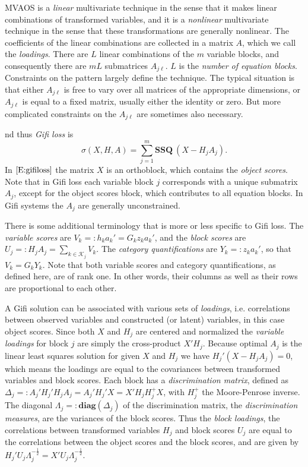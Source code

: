 \documentclass[
  12pt,
  letterpaper,
  DIV=11,
  numbers=noendperiod]{scrreprt}
\newcommand{\df}{=:}
\begin{document}
MVAOS is a \emph{linear} multivariate technique in the sense that it
makes linear combinations of transformed variables, and it is a
\emph{nonlinear} multivariate technique in the sense that these
transformations are generally nonlinear. The coefficients of the linear
combinations are collected in a matrix \(A\), which we call the
\emph{loadings}. There are \(L\) linear combinations of the \(m\)
variable blocks, and consequently there are \(mL\) submatrices
\(A_{j\ell}\). \(L\) is the \emph{number of equation blocks}.
Constraints on the pattern largely define the technique. The typical
situation is that either \(A_{j\ell}\) is free to vary over all matrices
of the appropriate dimensions, or \(A_{j\ell}\) is equal to a fixed
matrix, usually either the identity or zero. But more complicated
constraints on the \(A_{j\ell}\) are sometimes also necessary.

nd thus \emph{Gifi loss} is \begin{equation}
\sigma(X,H,A)=\sum_{j=1}^m\mathbf{SSQ}\ (X-H_jA_j).\label{E:gifiloss}
\end{equation} In \(\eqref{E:gifiloss}\) the matrix \(X\) is an
orthoblock, which contains the \emph{object scores}. Note that in Gifi
loss each variable block \(j\) corresponds with a unique submatrix
\(A_j\), except for the object scores block, which contributes to all
equation blocks. In Gifi systems the \(A_j\) are generally
unconstrained.

There is some additional terminology that is more or less specific to
Gifi loss. The \emph{variable scores} are \(V_k\df h_ka_k'=G_kz_ka_k'\),
and the \emph{block scores} are
\(U_j\df H_jA_j=\sum_{k\in\mathcal{K}_j}V_k\). The \emph{category
quantifications} are \(Y_k\df z_ka_k'\), so that \(V_k=G_kY_k\). Note
that both variable scores and category quantifications, as defined here,
are of rank one. In other words, their columns as well as their rows are
proportional to each other.

A Gifi solution can be associated with various sets of \emph{loadings},
i.e. correlations between observed variables and constructed (or latent)
variables, in this case object scores. Since both \(X\) and \(H_j\) are
centered and normalized the \emph{variable loadings} for block \(j\) are
simply the cross-product \(X'H_j\). Because optimal \(A_j\) is the
linear least squares solution for given \(X\) and \(H_j\) we have
\(H_j'(X-H_jA_j)=0\), which means the loadings are equal to the
covariances between transformed variables and block scores. Each block
has a \emph{discrimination matrix}, defined as
\(\Delta_j\df A_j'H_j'H_jA_j=A_j'H_j'X=X'H_jH_j^+X\), with \(H_j^+\) the
Moore-Penrose inverse. The diagonal
\(\Lambda_j\df\mathbf{diag}(\Delta_j)\) of the discrimination matrix,
the \emph{discrimination measures}, are the variances of the block
scores. Thus the \emph{block loadings}, the correlations between
transformed variables \(H_j\) and block scores \(U_j\) are equal to the
correlations between the object scores and the block scores, and are
given by \(H_j'U_j\Lambda_j^{-\frac12}=X'U_j\Lambda_j^{-\frac12}\).
\end{document}
